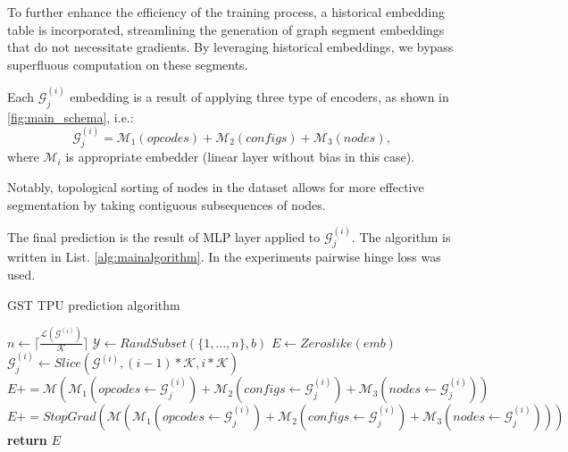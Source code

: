 \documentclass{article}
\begin{document}
To further enhance the efficiency of the training process, a historical embedding table is incorporated, streamlining the generation of graph segment embeddings that do not necessitate gradients. By leveraging historical embeddings, we bypass superfluous computation on these segments.

Each $\mathcal{G}^{(i)}_{j}$ embedding is a result of applying three type of encoders, as shown in \ref{fig:main_schema}, i.e.:
$$
\mathcal{G}^{(i)}_{j} = \mathcal{M}_1(opcodes) + \mathcal{M}_2(configs) + \mathcal{M}_3(nodes),
$$
where $\mathcal{M}_i$ is appropriate embedder (linear layer without bias in this case).

Notably, topological sorting of nodes in the dataset allows for more effective segmentation by taking contiguous subsequences of nodes.

The final prediction is the result of MLP layer applied to $\mathcal{G}^{(i)}_{j}$. The algorithm is written in List. \ref{alg:mainalgorithm}. In the experiments pairwise hinge loss was used.
\begin{algorithm}
\caption{GST TPU prediction algorithm}\label{alg:mainalgorithm}
\begin{algorithmic}[1]
\State $n \gets \lceil \frac{\mathcal{L}(\mathcal{G}^{(i)})}{\mathcal{K}} \rceil$
\State $\mathcal{Y} \gets RandSubset(\{1, ..., n\}, b)$
\State $E \gets  Zeroslike(emb)$
\State $\mathcal{G}^{(i)}_{j} \gets Slice(\mathcal{G}^{(i)}, (i-1)*\mathcal{K}, i*\mathcal{K})$
 
\State $ E +=  \mathcal{M}(\mathcal{M}_1(opcodes \gets \mathcal{G}^{(i)}_{j}) + \mathcal{M}_2(configs \gets \mathcal{G}^{(i)}_{j}) + \mathcal{M}_3(nodes \gets \mathcal{G}^{(i)}_{j}))$
\Else
\State $ E +=  StopGrad(\mathcal{M} (\mathcal{M}_1(opcodes \gets \mathcal{G}^{(i)}_{j}) + \mathcal{M}_2(configs \gets \mathcal{G}^{(i)}_{j}) + \mathcal{M}_3(nodes \gets \mathcal{G}^{(i)}_{j})))$
\EndIf
\EndFor\label{euclidendwhile}
\State \textbf{return} $E$
\EndProcedure
\end{algorithmic}
\end{algorithm}
\end{document}

